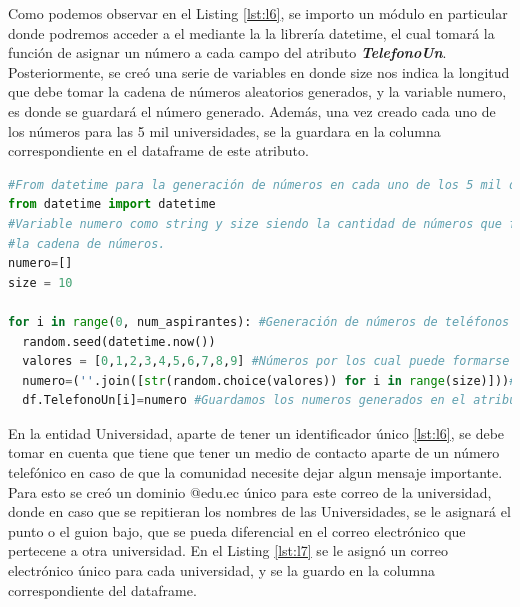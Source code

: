 \documentclass[10pt, oneside,spanish]{article}   	%
\begin{document}
Como podemos observar en el Listing \ref{lst:l6}, se importo un módulo en particular donde podremos acceder a el mediante la la librería datetime, el cual tomará la función de asignar un número a cada campo del atributo \textbf{\textit{TelefonoUn}}. Posteriormente, se creó una serie de variables en donde size nos indica la longitud que debe tomar la cadena de números aleatorios generados, y la variable numero, es donde se guardará el número generado. Además, una vez creado cada uno de los números para las 5 mil universidades, se la guardara en la columna correspondiente en el dataframe de este atributo.
\begin{lstlisting}[language=Python,label={lst:l6},caption=Atributo TelefonoUn de la entidad Universidad,frame=single, ]
#From datetime para la generación de números en cada uno de los 5 mil datos.
from datetime import datetime
#Variable numero como string y size siendo la cantidad de números que formaran
#la cadena de números.
numero=[]
size = 10

for i in range(0, num_aspirantes): #Generación de números de teléfonos
  random.seed(datetime.now())
  valores = [0,1,2,3,4,5,6,7,8,9] #Números por los cual puede formarse la cadena
  numero=(''.join([str(random.choice(valores)) for i in range(size)]))#Creación de los numeros
  df.TelefonoUn[i]=numero #Guardamos los numeros generados en el atributo TelefonoUn
\end{lstlisting}

En la entidad Universidad, aparte de tener un identificador único \ref{lst:l6}, se debe tomar en cuenta que tiene que tener un medio de contacto aparte de un número telefónico en caso de que la comunidad necesite dejar algun mensaje importante. Para esto se creó un dominio @edu.ec único para este correo de la universidad, donde en caso que se repitieran los nombres de las Universidades, se le asignará el punto o el guion bajo, que se pueda diferencial en el correo electrónico que pertecene a otra universidad. En el Listing \ref{lst:l7} se le asignó un correo electrónico único para cada universidad, y se la guardo en la columna correspondiente del dataframe.
\end{document}
